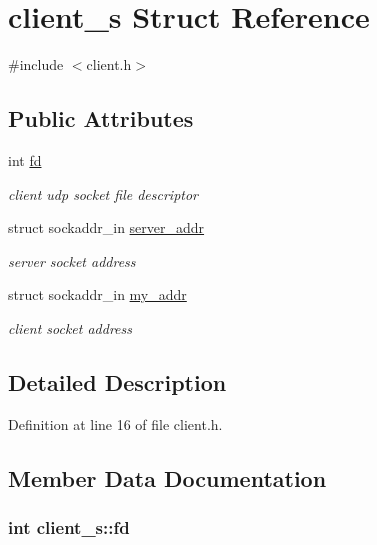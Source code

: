 \hypertarget{structclient__s}{\section{client\-\_\-s Struct Reference}
\label{structclient__s}
}


{\ttfamily \#include $<$client.\-h$>$}

\subsection*{Public Attributes}
\begin{DoxyCompactItemize}
\item 
int \hyperlink{structclient__s_a9babf0c4dea4b555e6b87a47f4ca98cd}{fd}
\begin{DoxyCompactList}\small\item\em client udp socket file descriptor \end{DoxyCompactList}\item 
struct sockaddr\-\_\-in \hyperlink{structclient__s_a4cb8f28435762b205424d16ea39dcab3}{server\-\_\-addr}
\begin{DoxyCompactList}\small\item\em server socket address \end{DoxyCompactList}\item 
struct sockaddr\-\_\-in \hyperlink{structclient__s_a618e45173f1bb6920a8c9afe885e16be}{my\-\_\-addr}
\begin{DoxyCompactList}\small\item\em client socket address \end{DoxyCompactList}\end{DoxyCompactItemize}


\subsection{Detailed Description}


Definition at line 16 of file client.\-h.



\subsection{Member Data Documentation}
\hypertarget{structclient__s_a9babf0c4dea4b555e6b87a47f4ca98cd}{
\subsubsection[{fd}]{\setlength{\rightskip}{0pt plus 5cm}int client\-\_\-s\-::fd}}\label{structclient__s_a9babf0c4dea4b555e6b87a47f4ca98cd}


